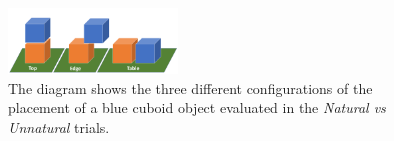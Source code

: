 \begin{figure}[H]
    \centering
    \includegraphics[width=0.4\textwidth, trim={0 0 0 0.7in},clip ] {figures/topedgetable.png}
    \vspace{-0.1in}
    \caption{
    The diagram shows the three different configurations of the placement of a blue cuboid object evaluated in the \textit{Natural vs Unnatural} trials. 
    }
    \label{fig:topedgetable}
    \vspace{-0.2in}
\end{figure}







